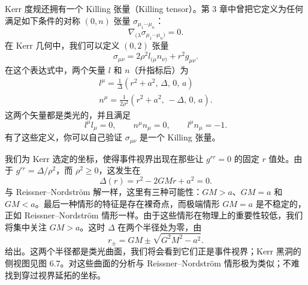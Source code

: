 


Kerr 度规还拥有一个 Killing 张量（Killing tensor）。第 3 章中曾把它定义为任何满足如下条件的对称 $(0,n)$ 张量 $\sigma_{\mu_{1}\cdots\mu_{n}}$：
\begin{equation*}
\nabla_{(\lambda}\sigma_{\mu_{1}\cdots\mu_{n})} = 0.
\tag{6.77}
\end{equation*}
在 Kerr 几何中，我们可以定义 $(0,2)$ 张量
\begin{equation*}
\sigma_{\mu\nu} = 2\rho^{2}l_{(\mu}n_{\nu)} + r^{2}g_{\mu\nu}.
\tag{6.78}
\end{equation*}
在这个表达式中，两个矢量 $l$ 和 $n$（升指标后）为
\begin{gather*}
l^{\mu} = \frac{1}{\Delta}\left(r^{2}+a^{2},\, \Delta,\, 0,\, a\right)\\
n^{\mu} = \frac{1}{2\rho^{2}}\left(r^{2}+a^{2},\, -\Delta,\, 0,\, a\right).
\tag{6.79}
\end{gather*}
这两个矢量都是类光的，并且满足
\begin{equation*}
l^{\mu}l_{\mu} = 0,\qquad n^{\mu}n_{\mu} = 0,\qquad l^{\mu}n_{\mu} = -1.
\tag{6.80}
\end{equation*}
有了这些定义，你可以自己验证 $\sigma_{\mu\nu}$ 是一个 Killing 张量。

我们为 Kerr 选定的坐标，使得事件视界出现在那些让 $g^{rr}=0$ 的固定 $r$ 值处。由于 $g^{rr}=\Delta/\rho^{2}$，而 $\rho^{2}\geq 0$，这发生在
\begin{equation*}
\Delta(r) = r^{2} - 2GMr + a^{2} = 0.
\tag{6.81}
\end{equation*}
与 Reissner–Nordström 解一样，这里有三种可能性：$GM>a$、$GM=a$ 和 $GM<a$。最后一种情形的特征是存在裸奇点，而极端情形 $GM=a$ 是不稳定的，正如 Reissner–Nordström 情形一样。由于这些情形在物理上的重要性较低，我们将集中关注 $GM>a$。这时 $\Delta$ 在两个半径处为零，由
\begin{equation*}
r_{\pm} = GM \pm \sqrt{G^{2}M^{2}-a^{2}}.
\tag{6.82}
\end{equation*}
给出。这两个半径都是类光曲面，我们将会看到它们正是事件视界；Kerr 黑洞的侧视图见图 6.7。对这些曲面的分析与 Reissner–Nordström 情形极为类似；不难找到穿过视界延拓的坐标。

